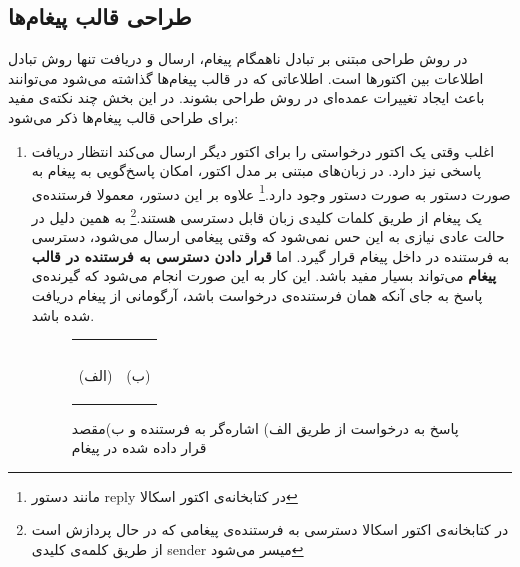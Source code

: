 \subsection{طراحی قالب پیغام‌ها}
در روش طراحی مبتنی بر تبادل ناهمگام پیغام، ارسال و دریافت تنها روش تبادل اطلاعات بین اکتورها است. اطلاعاتی که در قالب پیغام‌ها گذاشته می‌شود می‌توانند باعث ایجاد تغییرات عمده‌ای در روش طراحی بشوند. در این بخش چند نکته‌ی مفید برای طراحی قالب پیغام‌ها ذکر می‌شود:\\
\begin{enumerate}
\item اغلب وقتی یک اکتور درخواستی را برای اکتور دیگر ارسال می‌کند انتظار دریافت پاسخی نیز دارد. در زبان‌های مبتنی بر مدل اکتور، امکان پاسخ‌گویی به پیغام به صورت دستور به صورت دستور وجود دارد.\footnote{مانند دستور reply در کتابخانه‌ی اکتور اسکالا}  علاوه بر این دستور، معمولا فرستنده‌ی یک پیغام از طریق کلمات کلیدی زبان قابل دسترسی هستند.\footnote{ در کتابخانه‌ی اکتور اسکالا دسترسی به فرستنده‌ی پیغامی که در حال پردازش است از طریق کلمه‌ی کلیدی sender میسر می‌شود} به همین دلیل در حالت عادی نیازی به این حس نمی‌شود که وقتی پیغامی ارسال می‌شود،‌ دسترسی به فرستنده در داخل پیغام قرار گیرد. اما \textbf{قرار دادن دسترسی به فرستنده در قالب پیغام} می‌تواند بسیار مفید باشد. این کار به این صورت انجام می‌شود که گیرنده‌ی پاسخ به جای آنکه همان فرستنده‌ی درخواست باشد، آرگومانی از پیغام دریافت شده باشد.
\begin{figure}
    \begin{center}
    \begin{tabular}{|m{6cm}|m{6cm}|}
      	\hline
	 & \\
	\begin{latin}
\linespread{1.1}

\end{latin} & 
 \begin{latin}
	\linespread{1.1}
		
\end{latin}
 	\\
	\begin{center}(الف)\end{center}       &  \begin{center} (ب)\end{center}            \\
	\hline
    \end{tabular}
    \end{center}
    \caption{\label{fig:target_in_message}  پاسخ به درخواست از طریق الف) اشاره‌گر به فرستنده و ب)مقصد قرار داده شده در پیغام}
\end{figure}


\end{enumerate}
